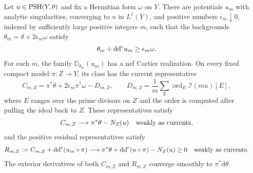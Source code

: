 \begin{theorem}\label{thm:varying-background-nef-approximation}
Let $u\in\mathrm{PSH}(Y,\theta)$ and fix a Hermitian form $\omega$ on $Y$. There are potentials $u_m$ with analytic singularities, converging to $u$ in $L^1(Y)$, and positive numbers $\epsilon_m\downarrow0$, indexed by sufficiently large positive integers $m$, such that the backgrounds $\theta_m=\theta+2\epsilon_m\omega$ satisfy
\[
 \theta_m+\mathrm{dd}^{\mathrm{c}} u_m\geq\epsilon_m\omega.
\]
For each $m$, the family $\mathbb D_{\theta_m}(u_m)$ has a nef Cartier realization. On every fixed compact model $\pi\colon Z\to Y$, its class has the current representative
\[
 C_{m,Z}=\pi^*\theta+2\epsilon_m\pi^*\omega-D_{m,Z},
 \qquad D_{m,Z}=\frac1m\sum_E\operatorname{ord}_E\mathcal I(mu)[E],
\]
where $E$ ranges over the prime divisors on $Z$ and the order is computed after pulling the ideal back to $Z$. These representatives satisfy
\[
 C_{m,Z}\longrightarrow\pi^*\theta-N_Z(u)
 \quad\hbox{weakly as currents},
\]
and the positive residual representatives satisfy
\[
 R_{m,Z}:=C_{m,Z}+\mathrm{dd}^{\mathrm{c}}(u_m\circ\pi)
 \longrightarrow \pi^*\theta+\mathrm{dd}^{\mathrm{c}}(u\circ\pi)-N_Z(u)\geq0
 \quad\hbox{weakly as currents}.
\]
The exterior derivatives of both $C_{m,Z}$ and $R_{m,Z}$ converge smoothly to $\pi^*\mathrm{d}\theta$.
\end{theorem}
